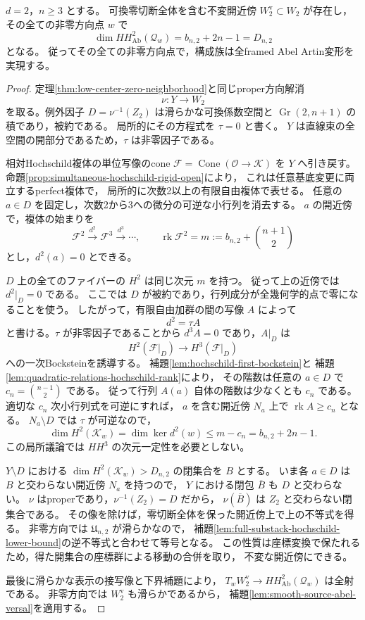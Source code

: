 \begin{proposition}[次数2の非零部分における最小Hochschild接空間]
\label{prop:degree-two-uniform-minimal-hochschild}
$d=2$，$n\ge3$ とする。
可換零切断全体を含む不変開近傍
$W_2^{\mathrm v}\subset W_2$ が存在し，
その全ての非零方向点 $w$ で
\[
 \dim HH^2_{\mathrm{Ab}}(\mathcal Q_w)
 =b_{n,2}+2n-1=D_{n,2}
\]
となる。
従ってその全ての非零方向点で，構成族は全framed Abel Artin変形を実現する。
\end{proposition}
\begin{proof}
定理\ref{thm:low-center-zero-neighborhood}と同じproper方向解消
\[
 \nu:Y\longrightarrow W_2
\]
を取る。例外因子 $D=\nu^{-1}(Z_2)$ は滑らかな可換係数空間と
$\operatorname{Gr}(2,n+1)$ の積であり，被約である。
局所的にその方程式を $\tau=0$ と書く。
$Y$ は直線束の全空間の開部分であるため，$\tau$ は非零因子である。

相対Hochschild複体の単位写像のcone
$\mathcal F=\operatorname{Cone}(\mathcal O\to\mathcal K)$ を $Y$ へ引き戻す。
命題\ref{prop:simultaneous-hochschild-rigid-open}により，
これは任意基底変更に両立するperfect複体で，
局所的に次数2以上の有限自由複体で表せる。
任意の $a\in D$ を固定し，次数2から3への微分の可逆な小行列を消去する。
$a$ の開近傍で，複体の始まりを
\[
 \mathcal F^2\xrightarrow{d^2}\mathcal F^3\xrightarrow{d^3}\cdots,
 \qquad
 \operatorname{rk}\mathcal F^2=m:=b_{n,2}+\binom{n+1}{2}
\]
とし，$d^2(a)=0$ とできる。

$D$ 上の全てのファイバーの $H^2$ は同じ次元 $m$ を持つ。
従って上の近傍では $d^2|_D=0$ である。
ここでは $D$ が被約であり，行列成分が全幾何学的点で零になることを使う。
したがって，有限自由加群の間の写像 $A$ によって
\[
 d^2=\tau A
\]
と書ける。$\tau$ が非零因子であることから
$d^3A=0$ であり，$A|_D$ は
\[
 H^2(\mathcal F|_D)\longrightarrow H^3(\mathcal F|_D)
\]
への一次Bocksteinを誘導する。
補題\ref{lem:hochschild-first-bockstein}と
補題\ref{lem:quadratic-relations-hochschild-rank}により，
その階数は任意の $a\in D$ で $c_n=\binom{n-1}{2}$ である。
従って行列 $A(a)$ 自体の階数は少なくとも $c_n$ である。
適切な $c_n$ 次小行列式を可逆にすれば，
$a$ を含む開近傍 $N_a$ 上で $\operatorname{rk}A\ge c_n$ となる。
$N_a\setminus D$ では $\tau$ が可逆なので，
\[
 \dim H^2(\mathcal K_w)
 =\dim\ker d^2(w)
 \le m-c_n
 =b_{n,2}+2n-1.
\]
この局所議論では $HH^3$ の次元一定性を必要としない。

$Y\setminus D$ における
$\dim H^2(\mathcal K_w)>D_{n,2}$ の閉集合を $B$ とする。
いま各 $a\in D$ は $B$ と交わらない開近傍 $N_a$ を持つので，
$Y$ における閉包 $\overline B$ も $D$ と交わらない。
$\nu$ はproperであり，$\nu^{-1}(Z_2)=D$ だから，
$\nu(\overline B)$ は $Z_2$ と交わらない閉集合である。
その像を除けば，零切断全体を保った開近傍上で上の不等式を得る。
非零方向では $\mathfrak U_{n,2}$ が滑らかなので，
補題\ref{lem:full-substack-hochschild-lower-bound}の逆不等式と合わせて等号となる。
この性質は座標変換で保たれるため，得た開集合の座標群による移動の合併を取り，
不変な開近傍にできる。

最後に滑らかな表示の接写像と下界補題により，
$T_wW_2^{\mathrm v}\to HH^2_{\mathrm{Ab}}(\mathcal Q_w)$ は全射である。
非零方向では $W_2^{\mathrm v}$ も滑らかであるから，
補題\ref{lem:smooth-source-abel-versal}を適用する。
\end{proof}

